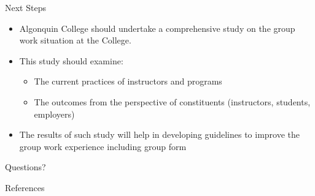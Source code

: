\documentclass[12pt,table]{beamer}
\begin{document}
\begin{frame}{Next Steps}
\begin{itemize}
    \item Algonquin College should undertake a comprehensive study on the group work situation at the College.
    \item This study should examine:
    \begin{itemize}
        \item The current practices of instructors and programs
        \item The outcomes from the perspective of constituents (instructors, students, employers)
    \end{itemize}
        \item The results of such study will help in developing guidelines to improve the group work experience including group form
\end{itemize}
\end{frame}

\begin{frame}[standout]
  \Huge Questions?
\end{frame}


\begin{frame}[allowframebreaks]{References}
  
  {\small}

\end{frame}
\end{document}
